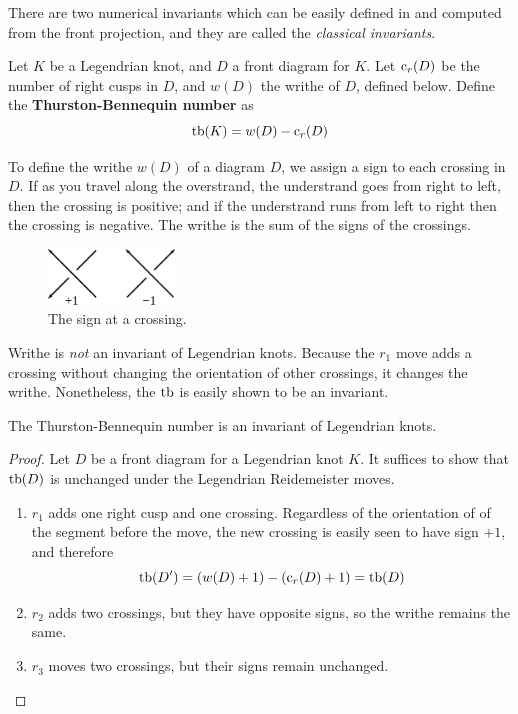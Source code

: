There are two numerical invariants which can be easily defined in and computed from the front projection, and they are called the \emph{classical invariants}.
\begin{definition}
    Let $K$ be a Legendrian knot, and $D$ a front diagram for $K$. Let $\operatorname{c}_r(D)$ be the number of right cusps in $D$, and $w(D)$ the writhe of $D$, defined below.
    Define the \textbf{Thurston-Bennequin number} as
    \[
        \operatorname{tb}(K) = w(D) - \operatorname{c}_r(D)
    \]
\end{definition}
To define the writhe $w(D)$ of a diagram $D$, we assign a sign to each crossing in $D$. If as you travel along the overstrand, the understrand goes from right to left, then the crossing is positive; and if the understrand runs from left to right then the crossing is negative. The writhe is the sum of the signs of the crossings.

\begin{figure}[ht]
    \centering
    \includegraphics[width=0.3\textwidth]{images/writhe.pdf}
    \caption{The sign at a crossing.}%
    \label{fig:writhe}
\end{figure}

Writhe is \emph{not} an invariant of Legendrian knots. Because the $r_1$ move adds a crossing without changing the orientation of other crossings, it changes the writhe. Nonetheless, the $\operatorname{tb}$ is easily shown to be an invariant.

\begin{proposition}
    The Thurston-Bennequin number is an invariant of Legendrian knots.
\end{proposition}
\begin{proof}
    Let $D$ be a front diagram for a Legendrian knot $K$. It suffices to show that $\operatorname{tb}(D)$ is unchanged under the Legendrian Reidemeister moves.

    \begin{enumerate}
        \item $r_1$ adds one right cusp and one crossing. Regardless of the orientation of of the segment before the move, the new crossing is easily seen to have sign $+1$, and therefore
            \[
                \operatorname{tb}(D') = (w(D) + 1) - (\operatorname{c}_r(D) + 1) = \operatorname{tb}(D)
            \]
        \item $r_2$ adds two crossings, but they have opposite signs, so the writhe remains the same.
        \item $r_3$ moves two crossings, but their signs remain unchanged.
    \end{enumerate}
    
\end{proof}

